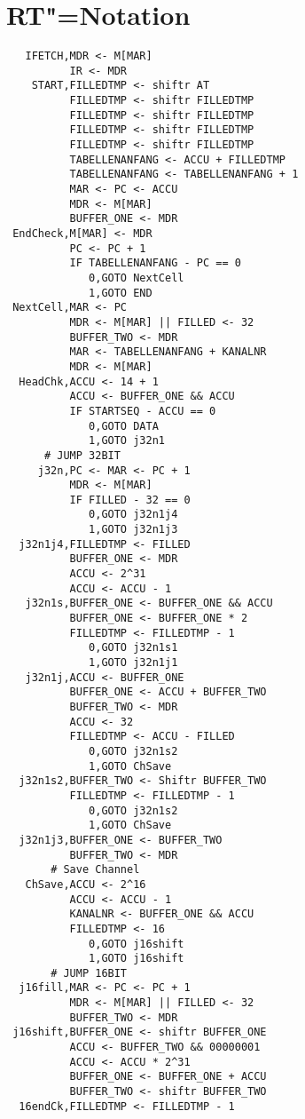 \chapter{RT"=Notation}
\label{chapter:Anhang-RtNotation}

{\footnotesize\linespread{0.75}\resetlinenumber\linenumbers\begin{verbatim}
   IFETCH,MDR <- M[MAR]
          IR <- MDR
    START,FILLEDTMP <- shiftr AT
          FILLEDTMP <- shiftr FILLEDTMP
          FILLEDTMP <- shiftr FILLEDTMP
          FILLEDTMP <- shiftr FILLEDTMP
          FILLEDTMP <- shiftr FILLEDTMP
          TABELLENANFANG <- ACCU + FILLEDTMP
          TABELLENANFANG <- TABELLENANFANG + 1
          MAR <- PC <- ACCU
          MDR <- M[MAR]
          BUFFER_ONE <- MDR
 EndCheck,M[MAR] <- MDR
          PC <- PC + 1
          IF TABELLENANFANG - PC == 0
             0,GOTO NextCell
             1,GOTO END
 NextCell,MAR <- PC
          MDR <- M[MAR] || FILLED <- 32
          BUFFER_TWO <- MDR
          MAR <- TABELLENANFANG + KANALNR
          MDR <- M[MAR]
  HeadChk,ACCU <- 14 + 1
          ACCU <- BUFFER_ONE && ACCU
          IF STARTSEQ - ACCU == 0
             0,GOTO DATA
             1,GOTO j32n1
      # JUMP 32BIT
     j32n,PC <- MAR <- PC + 1
          MDR <- M[MAR]
          IF FILLED - 32 == 0
             0,GOTO j32n1j4
             1,GOTO j32n1j3
  j32n1j4,FILLEDTMP <- FILLED
          BUFFER_ONE <- MDR
          ACCU <- 2^31
          ACCU <- ACCU - 1
   j32n1s,BUFFER_ONE <- BUFFER_ONE && ACCU
          BUFFER_ONE <- BUFFER_ONE * 2
          FILLEDTMP <- FILLEDTMP - 1
             0,GOTO j32n1s1
             1,GOTO j32n1j1
   j32n1j,ACCU <- BUFFER_ONE
          BUFFER_ONE <- ACCU + BUFFER_TWO
          BUFFER_TWO <- MDR
          ACCU <- 32
          FILLEDTMP <- ACCU - FILLED
             0,GOTO j32n1s2
             1,GOTO ChSave
  j32n1s2,BUFFER_TWO <- Shiftr BUFFER_TWO
          FILLEDTMP <- FILLEDTMP - 1
             0,GOTO j32n1s2
             1,GOTO ChSave
  j32n1j3,BUFFER_ONE <- BUFFER_TWO
          BUFFER_TWO <- MDR
       # Save Channel
   ChSave,ACCU <- 2^16
          ACCU <- ACCU - 1
          KANALNR <- BUFFER_ONE && ACCU
          FILLEDTMP <- 16
             0,GOTO j16shift
             1,GOTO j16shift
       # JUMP 16BIT
  j16fill,MAR <- PC <- PC + 1
          MDR <- M[MAR] || FILLED <- 32
          BUFFER_TWO <- MDR
 j16shift,BUFFER_ONE <- shiftr BUFFER_ONE
          ACCU <- BUFFER_TWO && 00000001
          ACCU <- ACCU * 2^31
          BUFFER_ONE <- BUFFER_ONE + ACCU
          BUFFER_TWO <- shiftr BUFFER_TWO
  16endCk,FILLEDTMP <- FILLEDTMP - 1

\end{verbatim}}
